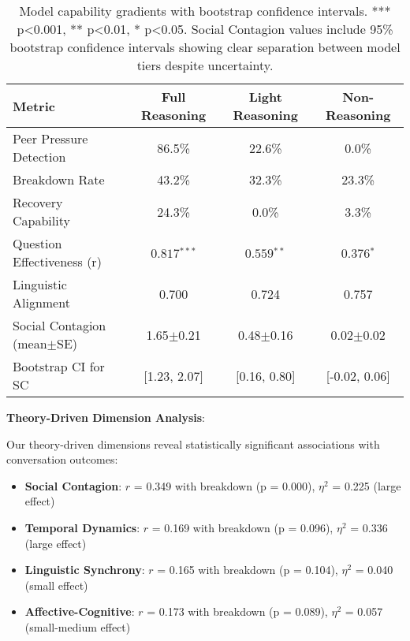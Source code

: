 \documentclass[11pt,letterpaper]{article}
\newcommand{\socialContagionBreakdownCorr}{0.349}
\newcommand{\socialContagionBreakdownP}{0.000}
\newcommand{\socialContagionEtaSquared}{0.225}
\newcommand{\temporalDynamicsBreakdownCorr}{0.169}
\newcommand{\temporalDynamicsBreakdownP}{0.096}
\newcommand{\temporalDynamicsEtaSquared}{0.336}
\newcommand{\linguisticSynchronyBreakdownCorr}{0.165}
\newcommand{\linguisticSynchronyBreakdownP}{0.104}
\newcommand{\linguisticSynchronyEtaSquared}{0.040}
\newcommand{\affectiveCognitiveBreakdownCorr}{0.173}
\newcommand{\affectiveCognitiveBreakdownP}{0.089}
\newcommand{\affectiveCognitiveEtaSquared}{0.057}
\newcommand{\socialContagionFullMean}{1.65}
\newcommand{\socialContagionFullSE}{0.21}
\newcommand{\socialContagionFullCI}{[1.23, 2.07]}
\newcommand{\socialContagionLightMean}{0.48}
\newcommand{\socialContagionLightSE}{0.16}
\newcommand{\socialContagionLightCI}{[0.16, 0.80]}
\newcommand{\socialContagionNoMean}{0.02}
\newcommand{\socialContagionNoSE}{0.02}
\newcommand{\socialContagionNoCI}{[-0.02, 0.06]}
\newcommand{\fullReasoningPeerPressure}{86.5\%}
\newcommand{\lightReasoningPeerPressure}{22.6\%}
\newcommand{\nonReasoningPeerPressure}{0.0\%}
\newcommand{\fullReasoningBreakdown}{43.2\%}
\newcommand{\lightReasoningBreakdown}{32.3\%}
\newcommand{\nonReasoningBreakdown}{23.3\%}
\newcommand{\fullReasoningRecovery}{24.3\%}
\newcommand{\lightReasoningRecovery}{0.0\%}
\newcommand{\nonReasoningRecovery}{3.3\%}
\newcommand{\fullQuestionCorrelation}{0.817}
\newcommand{\lightQuestionCorrelation}{0.559}
\newcommand{\nonQuestionCorrelation}{0.376}
\newcommand{\fullLinguisticAlignment}{0.700}
\newcommand{\lightLinguisticAlignment}{0.724}
\newcommand{\nonLinguisticAlignment}{0.757}
\begin{document}
\begin{table}[h]
\centering
\begin{tabular}{lccc}
\toprule
Metric & Full Reasoning & Light Reasoning & Non-Reasoning \\
\midrule
Peer Pressure Detection & \fullReasoningPeerPressure{} & \lightReasoningPeerPressure{} & \nonReasoningPeerPressure{} \\
Breakdown Rate & \fullReasoningBreakdown{} & \lightReasoningBreakdown{} & \nonReasoningBreakdown{} \\
Recovery Capability & \fullReasoningRecovery{} & \lightReasoningRecovery{} & \nonReasoningRecovery{} \\
Question Effectiveness (r) & $\fullQuestionCorrelation{}^{***}$ & $\lightQuestionCorrelation{}^{**}$ & $\nonQuestionCorrelation{}^{*}$ \\
Linguistic Alignment & \fullLinguisticAlignment{} & \lightLinguisticAlignment{} & \nonLinguisticAlignment{} \\
Social Contagion (mean$\pm$SE) & \socialContagionFullMean{}$\pm$\socialContagionFullSE{} & \socialContagionLightMean{}$\pm$\socialContagionLightSE{} & \socialContagionNoMean{}$\pm$\socialContagionNoSE{} \\
Bootstrap CI for SC & \socialContagionFullCI{} & \socialContagionLightCI{} & \socialContagionNoCI{} \\
\bottomrule
\end{tabular}
\caption{Model capability gradients with bootstrap confidence intervals. *** p<0.001, ** p<0.01, * p<0.05. Social Contagion values include 95\% bootstrap confidence intervals showing clear separation between model tiers despite uncertainty.}
\label{tab:capability_gradients}
\end{table}

\textbf{Theory-Driven Dimension Analysis}:

Our theory-driven dimensions reveal statistically significant associations with conversation outcomes:

\begin{itemize}
    \item \textbf{Social Contagion}: $r$ = \socialContagionBreakdownCorr{} with breakdown (p = \socialContagionBreakdownP{}), $\eta^2$ = \socialContagionEtaSquared{} (large effect)
    \item \textbf{Temporal Dynamics}: $r$ = \temporalDynamicsBreakdownCorr{} with breakdown (p = \temporalDynamicsBreakdownP{}), $\eta^2$ = \temporalDynamicsEtaSquared{} (large effect)
    \item \textbf{Linguistic Synchrony}: $r$ = \linguisticSynchronyBreakdownCorr{} with breakdown (p = \linguisticSynchronyBreakdownP{}), $\eta^2$ = \linguisticSynchronyEtaSquared{} (small effect)
    \item \textbf{Affective-Cognitive}: $r$ = \affectiveCognitiveBreakdownCorr{} with breakdown (p = \affectiveCognitiveBreakdownP{}), $\eta^2$ = \affectiveCognitiveEtaSquared{} (small-medium effect)
\end{itemize}
\end{document}
